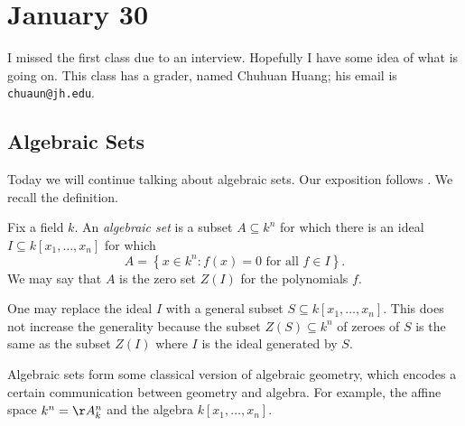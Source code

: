 \documentclass[../notes.tex]{subfiles}
\begin{document}
\section{January 30}

I missed the first class due to an interview. Hopefully I have some idea of what is going on. This class has a grader, named Chuhuan Huang; his email is \texttt{chuaun@jh.edu}.

\subsection{Algebraic Sets}
Today we will continue talking about algebraic sets. Our exposition follows \cite[Section~11.2]{lang-algebra}. We recall the definition.
\begin{definition}[algebraic]
	Fix a field $k$. An \textit{algebraic set} is a subset $A\subseteq k^n$ for which there is an ideal $I\subseteq k[x_1,\ldots,x_n]$ for which
	\[A=\left\{x\in k^n:f(x)=0\text{ for all }f\in I\right\}.\]
	We may say that $A$ is the zero set $Z(I)$ for the polynomials $f$.
\end{definition}
\begin{remark}
	One may replace the ideal $I$ with a general subset $S\subseteq k[x_1,\ldots,x_n]$. This does not increase the generality because the subset $Z(S)\subseteq k^n$ of zeroes of $S$ is the same as the subset $Z(I)$ where $I$ is the ideal generated by $S$.
\end{remark}
Algebraic sets form some classical version of algebraic geometry, which encodes a certain communication between geometry and algebra. For example, the affine space $k^n=\AA^n_k$ and the algebra $k[x_1,\ldots,x_n]$.
\end{document}
